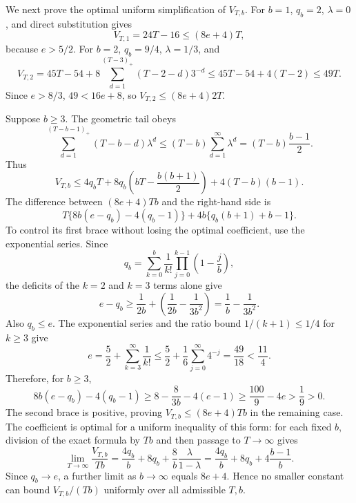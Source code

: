We next prove the optimal uniform simplification of \(V_{T,b}\). For \(b=1\), \(q_b=2\), \(\lambda=0\), and direct substitution gives
\[
V_{T,1}=24T-16\le(8e+4)T,
\]
because \(e>5/2\). For \(b=2\), \(q_b=9/4\), \(\lambda=1/3\), and
\[
V_{T,2}=45T-54+8\sum_{d=1}^{(T-3)_+}(T-2-d)3^{-d}
\le45T-54+4(T-2)\le49T.
\]
Since \(e>8/3\), \(49<16e+8\), so \(V_{T,2}\le(8e+4)2T\).

Suppose \(b\ge3\). The geometric tail obeys
\[
\sum_{d=1}^{(T-b-1)_+}(T-b-d)\lambda^d
\le(T-b)\sum_{d=1}^{\infty}\lambda^d
=(T-b)\frac{b-1}{2}.
\]
Thus
\[
V_{T,b}\le4q_bT+8q_b\left(bT-\frac{b(b+1)}2\right)+4(T-b)(b-1).
\]
The difference between \((8e+4)Tb\) and the right-hand side is
\[
T\{8b(e-q_b)-4(q_b-1)\}+4b\{q_b(b+1)+b-1\}.
\]
To control its first brace without losing the optimal coefficient, use the exponential series. Since
\[
q_b=\sum_{k=0}^b\frac1{k!}\prod_{j=0}^{k-1}\left(1-\frac jb\right),
\]
the deficits of the \(k=2\) and \(k=3\) terms alone give
\[
e-q_b\ge\frac1{2b}+\left(\frac1{2b}-\frac1{3b^2}\right)
=\frac1b-\frac1{3b^2}.
\]
Also \(q_b\le e\). The exponential series and the ratio bound \(1/(k+1)\le1/4\) for \(k\ge3\) give
\[
e=\frac52+\sum_{k=3}^{\infty}\frac1{k!}
\le\frac52+\frac16\sum_{j=0}^{\infty}4^{-j}
=\frac{49}{18}<\frac{11}{4}.
\]
Therefore, for \(b\ge3\),
\[
8b(e-q_b)-4(q_b-1)
\ge8-\frac8{3b}-4(e-1)
\ge\frac{100}{9}-4e>\frac19>0.
\]
The second brace is positive, proving \(V_{T,b}\le(8e+4)Tb\) in the remaining case. The coefficient is optimal for a uniform inequality of this form: for each fixed \(b\), division of the exact formula by \(Tb\) and then passage to \(T\to\infty\) gives
\[
\lim_{T\to\infty}\frac{V_{T,b}}{Tb}
=\frac{4q_b}{b}+8q_b+\frac{8}{b}\frac{\lambda}{1-\lambda}
=\frac{4q_b}{b}+8q_b+4\frac{b-1}{b}.
\]
Since \(q_b\to e\), a further limit as \(b\to\infty\) equals \(8e+4\). Hence no smaller constant can bound \(V_{T,b}/(Tb)\) uniformly over all admissible \(T,b\).

